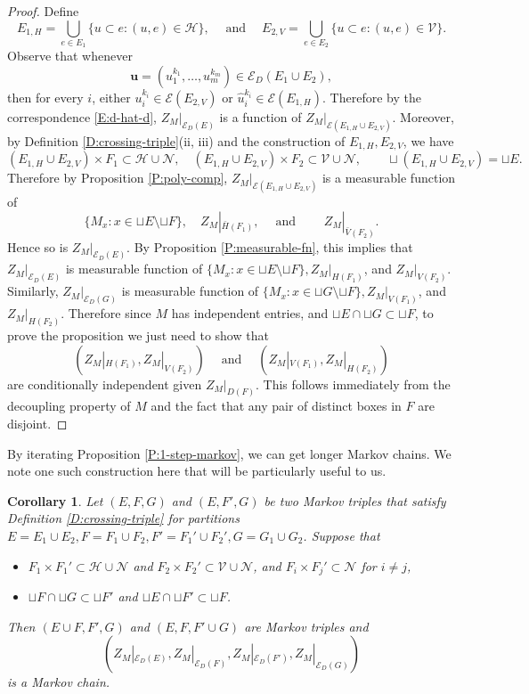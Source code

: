 \documentclass[aop, preprint]{imsart}
\theoremstyle{plain}
\newtheorem{corollary}[theorem]{Corollary}
\theoremstyle{definition}
\theoremstyle{plain}
\newcommand{\sset}{\subset}
\newcommand{\mathand}{\;\text{and}\;}
\newcommand{\scrE}{\mathcal{E}}
\newcommand{\scrV}{\mathcal{V}}
\newcommand{\scrH}{\mathcal{H}}
\newcommand{\scrN}{\mathcal{N}}
\newcommand{\X}{\times}
\newcommand{\smin}{\setminus}
\newcommand{\bu}{\mathbf{u}}
\begin{document}
\begin{proof} 
	Define
	$$
	E_{1, H} = \bigcup_{e \in E_1} \{u \sset e : (u, e) \in \scrH \}, \quad \mathand \quad  E_{2, V} = \bigcup_{e \in E_2} \{u \sset e : (u, e) \in \scrV \}.
	$$
	Observe that whenever 
	$$
	\bu =  (u_1^{k_1}, \dots, u_m^{k_m}) \in \scrE_D(E_1 \cup E_2),
	$$
	then for every $i$, either $u^{k_i}_i \in \scrE(E_{2, V})$ or $\hat u^{k_i}_i \in \scrE(E_{1, H})$. Therefore by the correspondence \eqref{E:d-hat-d}, $Z_M|_{\scrE_D(E)}$ is a function of $Z_M|_{\scrE(E_{1, H} \cup E_{2, V})}$.
	Moreover, by Definition \ref{D:crossing-triple}(ii, iii) and the construction of $E_{1, H}, E_{2, V}$, we have 
	$$
	(E_{1, H} \cup E_{2, V}) \X F_1 \sset \scrH \cup \scrN, \quad  (E_{1, H} \cup E_{2, V}) \X F_2 \sset \scrV \cup \scrN, \qquad \sqcup (E_{1, H} \cup E_{2, V}) = \sqcup E.
	$$
	Therefore by Proposition \ref{P:poly-comp}, $Z_M|_{\scrE(E_{1, H} \cup E_{2, V})}$ is a measurable function of 
	$$
	\{M_x : x \in \sqcup E \smin \sqcup F \}, \quad Z_M|_{\bar H(F_1)}, \quad \mathand \qquad Z_M|_{\bar V(F_2)}.
	$$
	Hence so is $Z_M|_{\scrE_D(E)}$. By Proposition \ref{P:measurable-fn}, this implies that $Z_M|_{\scrE_D(E)}$ is measurable function of  $\{M_x : x \in \sqcup E \smin \sqcup F \}, Z_M|_{H(F_1)}$, and $Z_M|_{V(F_2)}$.
	Similarly, $Z_M|_{\scrE_D(G)}$ is measurable function of  
	$\{M_x : x \in \sqcup G \smin \sqcup F \}, Z_M|_{V(F_1)}$, and $Z_M|_{H(F_2)}$. Therefore since $M$ has independent entries, and $\sqcup E \cap \sqcup G \sset \sqcup F$, to prove the proposition we just need to show that 
	$$
	(Z_M|_{H(F_1)},Z_M|_{V(F_2)}) \quad \mathand \quad (Z_M|_{V(F_1)},Z_M|_{H(F_2)}) 
	$$
	are conditionally independent given $Z_M|_{D(F)}$. This follows immediately from the decoupling property of $M$ and the fact that any pair of distinct boxes in $F$ are disjoint.
\end{proof}

By iterating Proposition \ref{P:1-step-markov}, we can get longer Markov chains. We note one such construction here that will be particularly useful to us. 

\begin{corollary}
	\label{C:2-step-Markov}
	Let $(E, F, G)$ and $(E, F', G)$ be two Markov triples that satisfy Definition \ref{D:crossing-triple} for partitions $E = E_1 \cup E_2, F = F_1 \cup F_2, F' = F_1' \cup F_2', G = G_1 \cup G_2$. Suppose that 
	\begin{itemize}[nosep]
		\item $F_1 \X F_1' \sset \scrH \cup \scrN$ and $F_2 \X F_2' \sset \scrV \cup \scrN$,
		and $F_i \X F_j' \sset \scrN$ for $i \ne j$,
		\item $\sqcup F \cap \sqcup G \sset \sqcup F'$ and $\sqcup E \cap \sqcup F' \sset \sqcup F$. 
	\end{itemize}
	Then $(E \cup F, F', G)$ and $(E, F, F' \cup G)$ are Markov triples and  
	\begin{equation}
	\label{E:4-chain}
	(Z_M|_{\scrE_D(E)}, Z_M|_{\scrE_D(F)}, Z_M|_{\scrE_D(F')}, Z_M|_{\scrE_D(G)})
	\end{equation}
	is a Markov chain.
\end{corollary}
\end{document}
